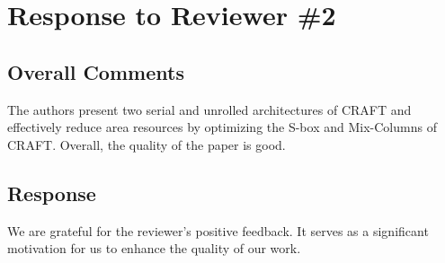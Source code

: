 \section{Response to Reviewer \#2}
\subsection*{Overall Comments}
The authors present two serial and unrolled architectures of CRAFT and effectively reduce area resources by optimizing the S-box and Mix-Columns of CRAFT. Overall, the quality of the paper is good.

\subsection{Response} 

We are grateful for the reviewer's positive feedback. It serves as a significant motivation for us to enhance the quality of our work.

